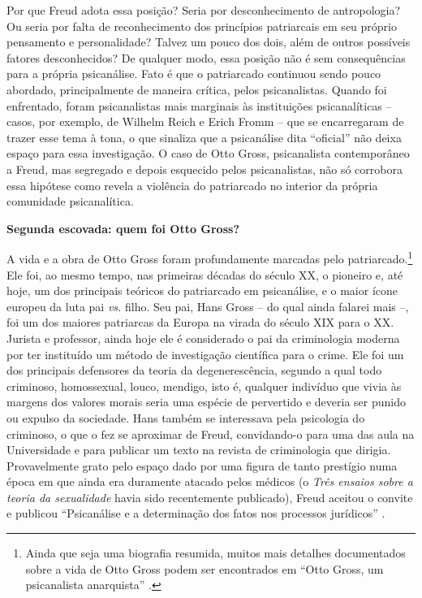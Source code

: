 Por que Freud adota essa posição? Seria por desconhecimento de
antropologia? Ou seria por falta de reconhecimento dos princípios
patriarcais em seu próprio pensamento e personalidade? Talvez um pouco
dos dois, além de outros possíveis fatores desconhecidos? De qualquer
modo, essa posição não é sem consequências para a própria psicanálise.
Fato é que o patriarcado continuou sendo pouco abordado, principalmente
de maneira crítica, pelos psicanalistas. Quando foi enfrentado, foram
psicanalistas mais marginais às instituições psicanalíticas -- casos,
por exemplo, de Wilhelm Reich e Erich Fromm -- que se encarregaram de
trazer esse tema à tona, o que sinaliza que a psicanálise dita
``oficial'' não deixa espaço para essa investigação. O caso de Otto
Gross, psicanalista contemporâneo a Freud, mas segregado e depois
esquecido pelos psicanalistas, não só corrobora essa hipótese como
revela a violência do patriarcado no interior da própria comunidade
psicanalítica.

\textbf{Segunda escovada: quem foi Otto Gross? }

A vida e a obra de Otto Gross foram profundamente marcadas pelo
patriarcado.\footnote{Ainda que seja uma biografia resumida, muitos mais
  detalhes documentados sobre a vida de Otto Gross podem ser encontrados
  em ``Otto Gross, um psicanalista anarquista'' .} Ele foi, ao mesmo
tempo, nas primeiras décadas do século XX, o pioneiro e, até hoje, um
dos principais teóricos do patriarcado em psicanálise, e o maior ícone
europeu da luta pai \emph{vs.} filho. Seu pai, Hans Gross -- do qual
ainda falarei mais --, foi um dos maiores patriarcas da Europa na virada
do século XIX para o XX. Jurista e professor, ainda hoje ele é
considerado o pai da criminologia moderna por ter instituído um método
de investigação científica para o crime. Ele foi um dos principais
defensores da teoria da degenerescência, segundo a qual todo criminoso,
homossexual, louco, mendigo, isto é, qualquer indivíduo que vivia às
margens dos valores morais seria uma espécie de pervertido e deveria ser
punido ou expulso da sociedade. Hans também se interessava pela
psicologia do criminoso, o que o fez se aproximar de Freud, convidando-o
para uma das aula na Universidade e para publicar um texto na revista de
criminologia que dirigia. Provavelmente grato pelo espaço dado por uma
figura de tanto prestígio numa época em que ainda era duramente atacado
pelos médicos (o \emph{Três ensaios sobre a teoria da sexualidade} havia
sido recentemente publicado), Freud aceitou o convite e publicou
``Psicanálise e a determinação dos fatos nos processos jurídicos'' .

